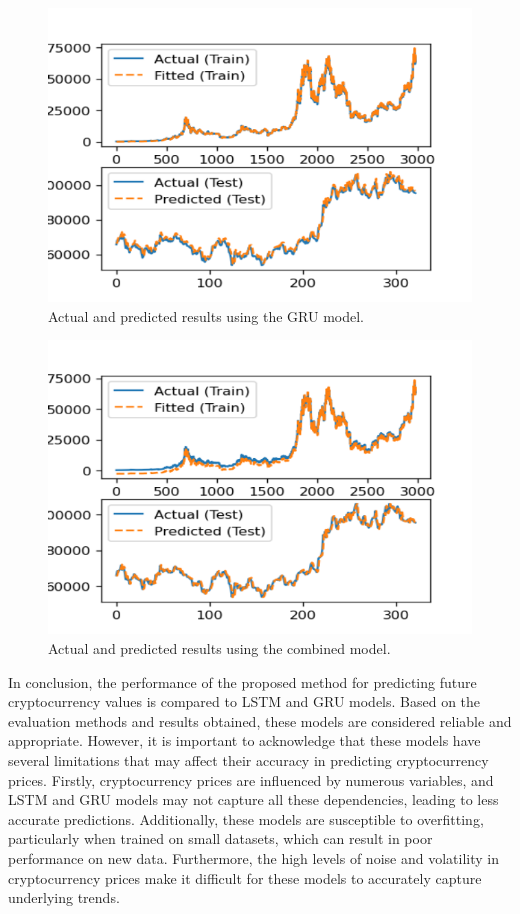 \documentclass[]{interact}
\theoremstyle{plain}%
\theoremstyle{definition}
\theoremstyle{remark}
\begin{document}
\begin{figure}[H]

{\centering \includegraphics[width=0.9\linewidth]{GRU1} 

}

\caption{Actual and predicted results using the GRU model.}\label{fig:r_gru}
\end{figure}

\begin{figure}[H]

{\centering \includegraphics[width=0.9\linewidth]{Comb} 

}

\caption{Actual and predicted results using the combined model.}\label{fig:r_comb}
\end{figure}

In conclusion, the performance of the proposed method for predicting
future cryptocurrency values is compared to LSTM and GRU models. Based
on the evaluation methods and results obtained, these models are
considered reliable and appropriate. However, it is important to
acknowledge that these models have several limitations that may affect
their accuracy in predicting cryptocurrency prices. Firstly,
cryptocurrency prices are influenced by numerous variables, and LSTM and
GRU models may not capture all these dependencies, leading to less
accurate predictions. Additionally, these models are susceptible to
overfitting, particularly when trained on small datasets, which can
result in poor performance on new data. Furthermore, the high levels of
noise and volatility in cryptocurrency prices make it difficult for
these models to accurately capture underlying trends.



\end{document}
